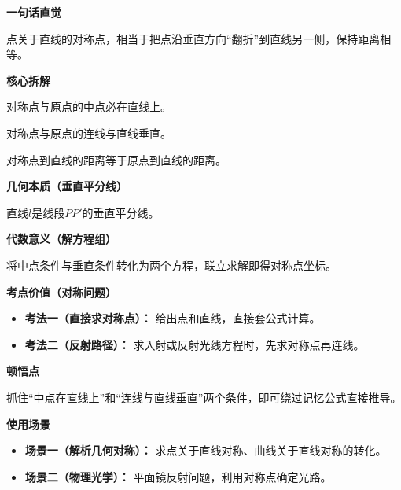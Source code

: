 \begin{explanationbox}
	\textbf{\textcolor{CExplanation}{一句话直觉}}

	点关于直线的对称点，相当于把点沿垂直方向“翻折”到直线另一侧，保持距离相等。

	\medskip
	\textbf{\textcolor{CExplanation}{核心拆解}}
	\begin{description}[style=nextline, leftmargin=2.8em, labelsep=0.5em, itemsep=0.45em]
		\item[\textbf{要点一（中点条件）：}] 对称点与原点的中点必在直线上。
		\item[\textbf{要点二（垂直条件）：}] 对称点与原点的连线与直线垂直。
		\item[\textbf{要点三（距离关系）：}] 对称点到直线的距离等于原点到直线的距离。
	\end{description}

	\medskip
	\textbf{\textcolor{CExplanation}{几何本质（垂直平分线）}}

	直线$l$是线段$PP'$的垂直平分线。

	\medskip
	\textbf{\textcolor{CExplanation}{代数意义（解方程组）}}

	将中点条件与垂直条件转化为两个方程，联立求解即得对称点坐标。

	\medskip
	\textbf{\textcolor{CExplanation}{考点价值（对称问题）}}
	\begin{itemize}[leftmargin=*, itemsep=0.5em, topsep=0.4em]
		\item \textbf{考法一（直接求对称点）：} 给出点和直线，直接套公式计算。
		\item \textbf{考法二（反射路径）：} 求入射或反射光线方程时，先求对称点再连线。
	\end{itemize}

	\medskip
	\textbf{\textcolor{CExplanation}{顿悟点}}

	抓住“中点在直线上”和“连线与直线垂直”两个条件，即可绕过记忆公式直接推导。

	\medskip
	\textbf{\textcolor{CExplanation}{使用场景}}
	\begin{itemize}[leftmargin=*, itemsep=0.5em, topsep=0.4em]
		\item \textbf{场景一（解析几何对称）：} 求点关于直线对称、曲线关于直线对称的转化。
		\item \textbf{场景二（物理光学）：} 平面镜反射问题，利用对称点确定光路。
	\end{itemize}
\end{explanationbox}
